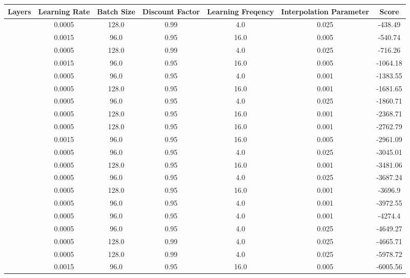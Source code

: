 \begin{table}[h]
\centering
\begin{tabular}{|c|c|c|c|c|c|c|}
\hline
Layers & Learning Rate & Batch Size & Discount Factor & Learning Freqency & Interpolation Parameter & Score \\
\hline
[32.0, 64.0, 32.0] & 0.0005 & 128.0 & 0.99 & 4.0 & 0.025 & -438.49 \\
\hline
[32.0, 32.0, 128.0] & 0.0015 & 96.0 & 0.95 & 16.0 & 0.005 & -540.74 \\
\hline
[32.0, 64.0] & 0.0005 & 128.0 & 0.99 & 4.0 & 0.025 & -716.26 \\
\hline
[32.0, 256.0] & 0.0015 & 96.0 & 0.95 & 16.0 & 0.005 & -1064.18 \\
\hline
[32.0, 64.0] & 0.0005 & 96.0 & 0.95 & 4.0 & 0.001 & -1383.55 \\
\hline
[32.0, 256.0] & 0.0005 & 128.0 & 0.95 & 16.0 & 0.001 & -1681.65 \\
\hline
[32.0, 256.0] & 0.0005 & 96.0 & 0.95 & 4.0 & 0.025 & -1860.71 \\
\hline
[256.0, 128.0, 256.0] & 0.0005 & 128.0 & 0.95 & 16.0 & 0.001 & -2368.71 \\
\hline
[32.0, 64.0] & 0.0005 & 128.0 & 0.95 & 16.0 & 0.001 & -2762.79 \\
\hline
[32.0, 64.0, 32.0] & 0.0015 & 96.0 & 0.95 & 16.0 & 0.005 & -2961.09 \\
\hline
[32.0, 64.0, 32.0] & 0.0005 & 96.0 & 0.95 & 4.0 & 0.025 & -3045.01 \\
\hline
[32.0, 32.0, 128.0] & 0.0005 & 128.0 & 0.95 & 16.0 & 0.001 & -3481.06 \\
\hline
[32.0, 32.0, 128.0] & 0.0005 & 96.0 & 0.95 & 4.0 & 0.025 & -3687.24 \\
\hline
[32.0, 64.0, 32.0] & 0.0005 & 128.0 & 0.95 & 16.0 & 0.001 & -3696.9 \\
\hline
[32.0, 64.0, 32.0] & 0.0005 & 96.0 & 0.95 & 4.0 & 0.001 & -3972.55 \\
\hline
[32.0, 32.0, 128.0] & 0.0005 & 96.0 & 0.95 & 4.0 & 0.001 & -4274.4 \\
\hline
[32.0, 64.0] & 0.0005 & 96.0 & 0.95 & 4.0 & 0.025 & -4649.27 \\
\hline
[32.0, 256.0] & 0.0005 & 128.0 & 0.99 & 4.0 & 0.025 & -4665.71 \\
\hline
[32.0, 32.0, 128.0] & 0.0005 & 128.0 & 0.99 & 4.0 & 0.025 & -5978.72 \\
\hline
[32.0, 64.0] & 0.0015 & 96.0 & 0.95 & 16.0 & 0.005 & -6005.56 \\

\end{tabular}
\end{table}
